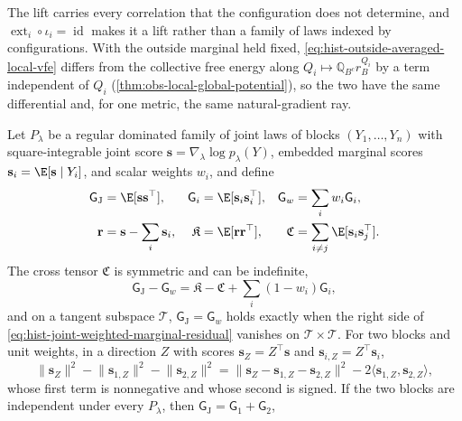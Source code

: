 The lift carries every correlation that the configuration does not determine, and
$\operatorname{ext}_i\circ\iota_i=\operatorname{id}$ makes it a lift rather than a family
of laws indexed by configurations.  With the outside marginal held fixed,
\eqref{eq:hist-outside-averaged-local-vfe} differs from the collective free energy along
$Q_i\mapsto\mathbb Q_{B^c}r_B^{Q_i}$ by a term independent of $Q_i$
(\cref{thm:obs-local-global-potential}), so the two have the same differential and, for
one metric, the same natural-gradient ray.

Let $P_\lambda$ be a regular dominated family of joint laws of blocks
$(Y_1,\dots,Y_n)$ with square-integrable joint score
$\mathbf s=\nabla_\lambda\log p_\lambda(Y)$, embedded marginal scores
$\mathbf s_i=\E[\mathbf s\mid Y_i]$, and scalar weights $w_i$, and define
\begin{align}
\mathsf G_{\mathrm J}&=\E[\mathbf s\mathbf s^\top],
&\mathsf G_i&=\E[\mathbf s_i\mathbf s_i^\top],
&\mathsf G_w&=\sum_iw_i\mathsf G_i,
\label{eq:hist-score-metrics}\\
\mathbf r&=\mathbf s-\sum_i\mathbf s_i,
&\mathfrak K&=\E[\mathbf r\mathbf r^\top],
&\mathfrak C&=\sum_{i\ne j}\E[\mathbf s_i\mathbf s_j^\top].
\label{eq:hist-score-residual-tensors}
\end{align}
The cross tensor $\mathfrak C$ is symmetric and can be indefinite,
\begin{equation}
\mathsf G_{\mathrm J}-\mathsf G_w
=\mathfrak K-\mathfrak C+\sum_i(1-w_i)\mathsf G_i,
\label{eq:hist-joint-weighted-marginal-residual}
\end{equation}
and on a tangent subspace $\mathcal T$, $\mathsf G_{\mathrm J}=\mathsf G_w$ holds exactly
when the right side of \eqref{eq:hist-joint-weighted-marginal-residual} vanishes on
$\mathcal T\times\mathcal T$.  For two blocks and unit weights, in a direction $Z$ with
scores $\mathbf s_Z=Z^\top\mathbf s$ and $\mathbf s_{i,Z}=Z^\top\mathbf s_i$,
\begin{equation}
\lVert\mathbf s_Z\rVert^2
-\lVert\mathbf s_{1,Z}\rVert^2-\lVert\mathbf s_{2,Z}\rVert^2
=\lVert\mathbf s_Z-\mathbf s_{1,Z}-\mathbf s_{2,Z}\rVert^2
-2\langle\mathbf s_{1,Z},\mathbf s_{2,Z}\rangle,
\label{eq:hist-joint-versus-product}
\end{equation}
whose first term is nonnegative and whose second is signed.  If the two blocks are
independent under every $P_\lambda$, then $\mathsf G_{\mathrm J}=\mathsf G_1+\mathsf G_2$,

